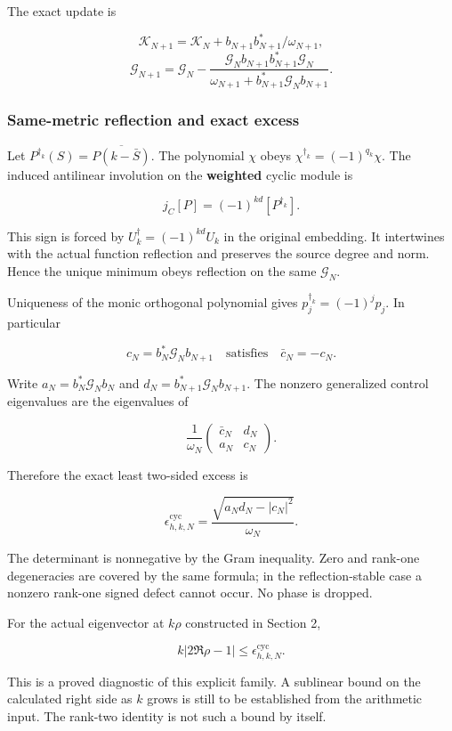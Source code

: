 \documentclass[
]{article}
\begin{document}
The exact update is

\[\mathcal K_{N+1}=\mathcal K_N+b_{N+1}b_{N+1}^*/\omega_{N+1},\]
\[\mathcal G_{N+1}=\mathcal G_N-
\frac{\mathcal G_Nb_{N+1}b_{N+1}^*\mathcal G_N}
{\omega_{N+1}+b_{N+1}^*\mathcal G_Nb_{N+1}}.\tag{4.10}\]

\subsubsection{Same-metric reflection and exact
excess}\label{same-metric-reflection-and-exact-excess}

Let \(P^{\dagger_k}(S)=\overline{P(k-\bar S)}\). The polynomial \(\chi\)
obeys \(\chi^{\dagger_k}=(-1)^{q_k}\chi\). The induced antilinear
involution on the \textbf{weighted} cyclic module is

\[j_C[P]=(-1)^{kd}[P^{\dagger_k}].\tag{4.11}\]

This sign is forced by \(U_k^\dagger=(-1)^{kd}U_k\) in the original
embedding. It intertwines with the actual function reflection and
preserves the source degree and norm. Hence the unique minimum obeys
reflection on the same \(\mathcal G_N\).

Uniqueness of the monic orthogonal polynomial gives
\(p_j^{\dagger_k}=(-1)^jp_j\). In particular

\[c_N=b_N^*\mathcal G_Nb_{N+1}\quad\text{satisfies}\quad \bar c_N=-c_N.\]

Write \(a_N=b_N^*\mathcal G_Nb_N\) and
\(d_N=b_{N+1}^*\mathcal G_Nb_{N+1}\). The nonzero generalized control
eigenvalues are the eigenvalues of

\[\frac1{\omega_N}\begin{pmatrix}\bar c_N&d_N\\a_N&c_N\end{pmatrix}.\]

Therefore the exact least two-sided excess is

\[\boxed{\epsilon_{h,k,N}^{\mathrm{cyc}}=
\frac{\sqrt{a_Nd_N-|c_N|^2}}{\omega_N}.}\tag{4.12}\]

The determinant is nonnegative by the Gram inequality. Zero and rank-one
degeneracies are covered by the same formula; in the reflection-stable
case a nonzero rank-one signed defect cannot occur. No phase is dropped.

For the actual eigenvector at \(k\rho\) constructed in Section 2,

\[\boxed{k|2\Re\rho-1|\le\epsilon_{h,k,N}^{\mathrm{cyc}}.}\tag{4.13}\]

This is a proved diagnostic of this explicit family. A sublinear bound
on the calculated right side as \(k\) grows is still to be established
from the arithmetic input. The rank-two identity is not such a bound by
itself.
\end{document}
